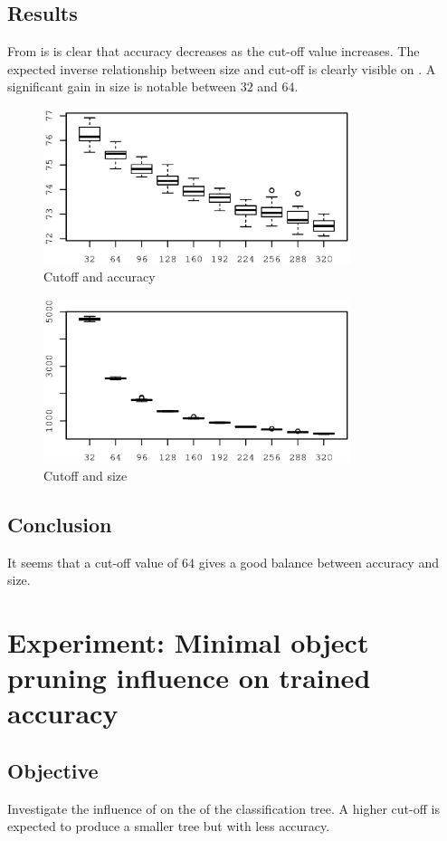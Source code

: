 \subsection{Results}
From  is is clear that accuracy decreases as the cut-off value increases.  The expected inverse relationship between size and cut-off is clearly visible  on .  A significant gain in size is notable between $32$ and $64$. 
\begin{figure} 
\center
\includegraphics[width=0.8\textwidth]{artifacts/c4-026acc.eps}
\caption{Cutoff and accuracy}
\label{fig:c4-026-a}
\end{figure}
\begin{figure} 
\center
\includegraphics[width=0.8\textwidth]{artifacts/c4-026size.eps}
\caption{Cutoff and size}
\label{fig:c4-026-s}
\end{figure}
\subsection{Conclusion}
It seems that a cut-off value of $64$ gives a good balance between accuracy and size.

\section{Experiment: Minimal object pruning influence on trained accuracy}
\subsection{Objective}
Investigate the influence of  on the  of the classification tree. A higher cut-off is expected to produce a smaller tree but with less accuracy.   

